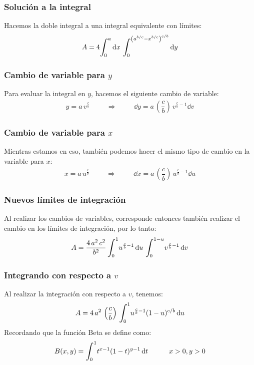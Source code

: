 \documentclass[12pt]{beamer}
\begin{document}
\begin{frame}
\frametitle{Solución a la integral}
Hacemos la doble integral a una integral equivalente con límites:
\pause
\begin{align*}
A = 4 \scaleint{6ex}_{\bs 0}^{a} \dd{x} \, \scaleint{6ex}_{\bs 0}^{\left( a^{b/c} - x^{b/c} \right)^{c/b}} \dd{y}
\end{align*}
\end{frame}
\begin{frame}
\frametitle{Cambio de variable para $y$}
Para evaluar la integral en $y$, hacemos el siguiente cambio de variable:
\pause
\begin{align*}
y = a \, v^{\frac{c}{b}} \hspace{1cm} \Longrightarrow \hspace{1cm} \dd{y} = a \, \left( \dfrac{c}{b} \right) \, v^{\frac{c}{b} - 1} \dd{v}
\end{align*}
\end{frame}
\begin{frame}
\frametitle{Cambio de variable para $x$}
Mientras estamos en eso, también podemos hacer el mismo tipo de cambio en la variable para $x$:
\pause 
\begin{align*}
x = a \, u^{\frac{c}{b}} \hspace{1cm} \Longrightarrow \hspace{1cm} \dd{x} = a \, \left( \dfrac{c}{b} \right) \, u^{\frac{c}{b} - 1} \dd{u}
\end{align*}
\end{frame}
\begin{frame}
\frametitle{Nuevos límites de integración}
Al realizar los cambios de variables, corresponde entonces también realizar el cambio en los límites de integración, por lo tanto:
\pause 
\begin{align*}
A = \dfrac{4 \, a^{2} \, c^{2}}{b^{2}} \, \scaleint{6ex}_{\bs 0}^{1} u^{\frac{c}{b} - 1} \dd{u} \, \scaleint{6ex}_{\bs 0}^{1-u} v^{\frac{c}{b} - 1} \dd{v}
\end{align*}
\end{frame}
\begin{frame}
\frametitle{Integrando con respecto a $v$}
Al realizar la integración con respecto a $v$, tenemos:
\pause 
\begin{align*}
A = 4 \, a^{2} \, \left( \dfrac{c}{b} \right) \, \scaleint{6ex}_{\bs 0}^{1} u^{\frac{c}{b} - 1} (1 - u)^{c/b} \dd{u}
\end{align*}
\pause
Recordando que la función Beta se define como:
\pause 
\begin{align*}
B(x, y) = \scaleint{6ex}_{\bs 0}^{1} t^{x-1} (1 - t)^{y-1} \dd{t} \hspace{1cm} x > 0, y > 0
\end{align*}
\end{frame}
\end{document}
